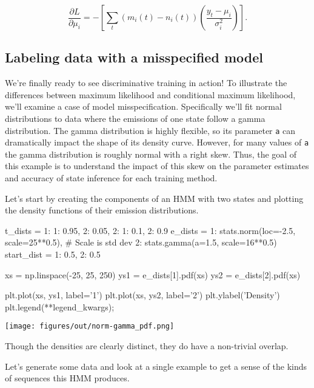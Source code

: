 \begin{equation*}
\frac{\partial L}{\partial \mu_i}
= -\left[
         \sum_t \left( m_i(t) - n_i(t) \right)
                \left( \frac{y_t - \mu_i}{\sigma_i^2} \right)
   \right].
\end{equation*}

\subsection{Labeling data with a misspecified model}

We're finally ready to see discriminative training in action! To illustrate the differences between maximum likelihood and conditional maximum likelihood, we'll examine a case of model misspecification. Specifically we'll fit normal distributions to data where the emissions of one state follow a gamma distribution. The gamma distribution is highly flexible, so its parameter \texttt{a} can dramatically impact the shape of its density curve. However, for many values of \texttt{a} the gamma distribution is roughly normal with a right skew. Thus, the goal of this example is to understand the impact of this skew on the parameter estimates and accuracy of state inference for each training method.

Let's start by creating the components of an HMM with two states and plotting the density functions of their emission distributions.

\begin{NotebookIn}
t_dists = {1: {1: 0.95, 2: 0.05},
           2: {1: 0.1, 2: 0.9}}
e_dists = {1: stats.norm(loc=-2.5, scale=25**0.5),  # Scale is std dev
           2: stats.gamma(a=1.5, scale=16**0.5)}
start_dist = {1: 0.5, 2: 0.5}

xs = np.linspace(-25, 25, 250)
ys1 = e_dists[1].pdf(xs)
ys2 = e_dists[2].pdf(xs)

plt.plot(xs, ys1, label='1')
plt.plot(xs, ys2, label='2')
plt.ylabel('Density')
plt.legend(**legend_kwargs);
\end{NotebookIn}

\begin{NotebookImage}
\texttt{[image: figures/out/norm-gamma\_pdf.png]}
\end{NotebookImage}

Though the densities are clearly distinct, they do have a non-trivial overlap.

Let's generate some data and look at a single example to get a sense of the kinds of sequences this HMM produces.

